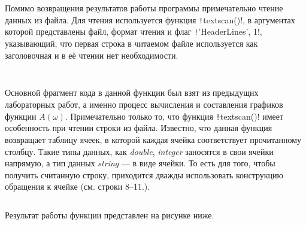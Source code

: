 Помимо возвращения результатов работы программы примечательно чтение данных из файла.
Для чтения используется функция \texttt!textscan()!, в аргументах которой представлены файл, формат чтения и флаг \texttt!'HeaderLines', 1!, указывающий, что первая строка в читаемом файле используется как заголовочная и в её чтении нет необходимости.

\begin{codemultipage}
    \inputminted{matlab}{code/table_1_func.m}
\end{codemultipage}


\subsection*{  }
\begin{quote}
    \textit{\exTwo}
\end{quote}

Основной фрагмент кода в данной функции был взят из предыдущих лабораторных работ, а именно процесс вычисления и составления графиков функции $A(\omega)$.
Примечательно только то, что функция \texttt!textscan()! имеет особенность при чтении строки из файла.
Известно, что данная функция возвращает таблицу ячеек, в которой каждая ячейка соответствует прочитанному столбцу.
Такие типы данных, как \textit{double}, \textit{integer} заносятся в свои ячейки напрямую, а тип данных \textit{string} --- в виде ячейки. То есть для того, чтобы получить считанную строку, приходится дважды использовать конструкцию обращения к ячейке (см. строки 8--11.).

\begin{codemultipage}
    \inputminted[highlightlines = {8-11}]{matlab}{code/table_2_func.m}
\end{codemultipage}

Результат работы функции представлен на рисунке ниже.


